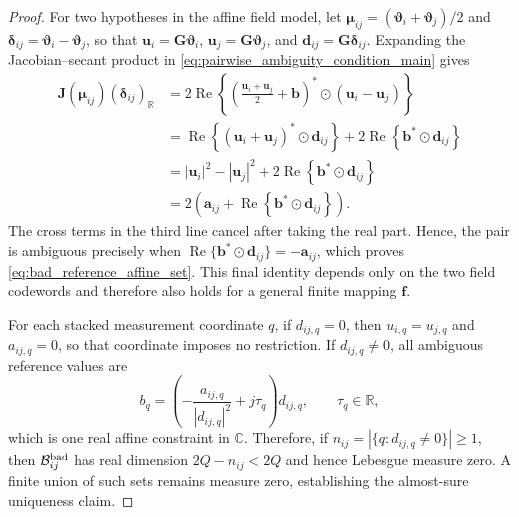 \documentclass[journal]{IEEEtran}
\begin{document}
\begin{proof}
For two hypotheses in the affine field model, let
$\boldsymbol\mu_{ij}=(\boldsymbol\vartheta_i+\boldsymbol\vartheta_j)/2$ and
$\boldsymbol\delta_{ij}=\boldsymbol\vartheta_i-\boldsymbol\vartheta_j$, so that
$\mathbf u_i=\mathbf G\boldsymbol\vartheta_i$,
$\mathbf u_j=\mathbf G\boldsymbol\vartheta_j$, and
$\mathbf d_{ij}=\mathbf G\boldsymbol\delta_{ij}$.  Expanding the Jacobian--secant
product in \eqref{eq:pairwise_ambiguity_condition_main} gives
\begin{align*}
\mathbf J(\boldsymbol\mu_{ij})
(\boldsymbol\delta_{ij})_{\mathbb R} 
&=2\operatorname{Re}\!\left\{
\left(\frac{\mathbf u_i+\mathbf u_j}{2}+\mathbf b\right)^*
\odot(\mathbf u_i-\mathbf u_j)\right\} \\
&=\operatorname{Re}\!\left\{(\mathbf u_i+\mathbf u_j)^*
\odot\mathbf d_{ij}\right\}
+2\operatorname{Re}\!\left\{\mathbf b^*\odot\mathbf d_{ij}\right\} \\
&=|\mathbf u_i|^2-|\mathbf u_j|^2
+2\operatorname{Re}\!\left\{\mathbf b^*\odot\mathbf d_{ij}\right\} \\
&=2\left(\mathbf a_{ij}
+\operatorname{Re}\!\left\{\mathbf b^*\odot\mathbf d_{ij}\right\}\right).
\end{align*}
The cross terms in the third line cancel after taking the real part.  Hence,
the pair is ambiguous precisely when
$\operatorname{Re}\{\mathbf b^*\odot\mathbf d_{ij}\}=-\mathbf a_{ij}$,
which proves \eqref{eq:bad_reference_affine_set}.  This final identity depends
only on the two field codewords and therefore also holds for a general finite
mapping $\mathbf f$.

For each stacked measurement coordinate $q$, if $d_{ij,q}=0$, then $u_{i,q}=u_{j,q}$ and $a_{ij,q}=0$, so that coordinate
imposes no restriction.  If $d_{ij,q}\ne0$, all ambiguous reference values are
\begin{equation*}
b_q=\left(-\frac{a_{ij,q}}{|d_{ij,q}|^2}+j\tau_q\right)d_{ij,q},
\qquad \tau_q\in\mathbb R,
\end{equation*}
which is one real affine constraint in $\mathbb C$.  Therefore, if
$n_{ij}=|\{q:d_{ij,q}\ne0\}|\geq1$, then
$\mathcal B_{ij}^{\rm bad}$ has real dimension $2Q-n_{ij}<2Q$ and hence
Lebesgue measure zero.  A finite union of such sets remains measure zero,
establishing the almost-sure uniqueness claim.
\end{proof}
\end{document}
